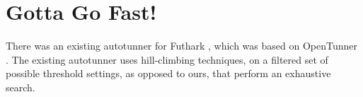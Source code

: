 \section{Gotta Go Fast!}
There was an existing autotunner for Futhark \cite{oldtune}, which was based on OpenTunner \cite{opentunner}. The existing autotunner uses hill-climbing techniques, on a filtered set of possible threshold settings, as opposed to ours, that perform an exhaustive search. 